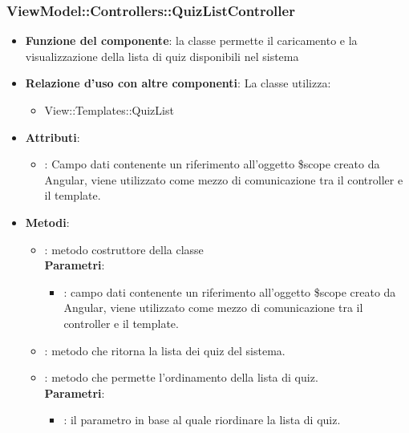 \subsubsection{ViewModel::Controllers::QuizListController}
\begin{itemize}
\item\textbf{Funzione del componente}:  la classe permette il caricamento e la visualizzazione della lista di quiz disponibili nel sistema
	\item\textbf{Relazione d'uso con altre componenti}:
La classe utilizza:
	\begin{itemize}
		\item View::Templates::QuizList
	\end{itemize}
\item\textbf{Attributi}:
	\begin{itemize}
		\item{}: Campo dati contenente un riferimento all’oggetto \$scope creato da Angular, viene utilizzato come mezzo di comunicazione tra il controller e il template.\\
	\end{itemize}
\item\textbf{Metodi}:
	\begin{itemize}
		\item{}: metodo costruttore della classe\\
		\textbf{Parametri}:
			\begin{itemize}
				\item{}: campo dati contenente un riferimento all’oggetto \$scope creato da Angular, viene utilizzato come mezzo di comunicazione tra il controller e il template.\\
			\end{itemize}
		\item{}: metodo che ritorna la lista dei quiz del sistema.\\		
		\item{}: metodo che permette l'ordinamento della lista di quiz.\\
		\textbf{Parametri}:
			\begin{itemize}
				\item{}: il parametro in base al quale riordinare la lista di quiz.\\
			\end{itemize}
	\end{itemize}
\end{itemize}


